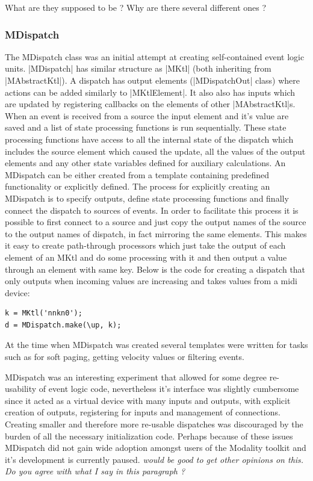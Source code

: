 \documentclass{article}
\begin{document}
What are they supposed to be ? Why are there several different ones ?	
	
\subsubsection{MDispatch}	

The MDispatch class was an initial attempt at creating self-contained event logic units. |MDispatch| has similar structure as |MKtl| (both inheriting from |MAbstractKtl|). A dispatch has output elements (|MDispatchOut| class) where actions can be added similarly to |MKtlElement|. It also also has inputs which are updated by registering callbacks on the elements of other |MAbstractKtl|s. When an event is received from a source the input element and it's value are saved and a list of state processing functions is run sequentially. These state processing functions have access to all the internal state of the dispatch which includes the source element which caused the update, all the values of the output elements and any other state variables defined for auxiliary calculations. An MDispatch can be either created from a template containing predefined functionality or explicitly defined. The process for explicitly creating an MDispatch is to specify outputs, define state processing functions and finally connect the dispatch to sources of events. In order to facilitate this process it is possible to first connect to a source and just copy the output names of the source to the output names of dispatch, in fact mirroring the same elements. This makes it easy to create path-through processors which just take the output of each element of an MKtl and do some processing with it and then output a value through an element with same key. Below is the code for creating a dispatch that only outputs when incoming values are increasing and takes values from a midi device:

\begin{Verbatim}
k = MKtl('nnkn0');
d = MDispatch.make(\up, k);
\end{Verbatim}

At the time when MDispatch was created several templates were written for tasks such as for soft paging, getting velocity values or filtering events. 

MDispatch was an interesting experiment that allowed for some degree re-usability of event logic code, nevertheless it's interface was slightly cumbersome since it acted as a virtual device with many inputs and outputs, with explicit creation of outputs, registering for inputs and management of connections. Creating smaller and therefore more re-usable dispatches was discouraged by the burden of all the necessary initialization code. Perhaps because of these issues MDispatch did not gain wide adoption amongst users of the Modality toolkit and it's development is currently paused. \emph{ would be good to get other opinions on this. Do you agree with what I say in this paragraph ? }
		
\end{document}
